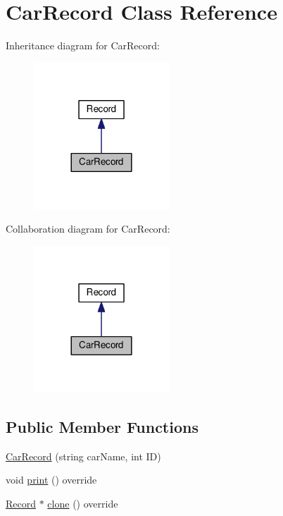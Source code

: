\hypertarget{classCarRecord}{}\section{Car\+Record Class Reference}
\label{classCarRecord}


Inheritance diagram for Car\+Record\+:\nopagebreak
\begin{figure}[H]
\begin{center}
\leavevmode
\includegraphics[width=144pt]{classCarRecord__inherit__graph}
\end{center}
\end{figure}


Collaboration diagram for Car\+Record\+:\nopagebreak
\begin{figure}[H]
\begin{center}
\leavevmode
\includegraphics[width=144pt]{classCarRecord__coll__graph}
\end{center}
\end{figure}
\subsection*{Public Member Functions}
\begin{DoxyCompactItemize}
\item 
\hyperlink{classCarRecord_ab1ff8a8eb47b4792718a2eff6012656e}{Car\+Record} (string car\+Name, int ID)
\item 
void \hyperlink{classCarRecord_a84789b5f6a61048c481d115c7058d664}{print} () override
\item 
\hyperlink{classRecord}{Record} $\ast$ \hyperlink{classCarRecord_a190ab69e95107c689455fd85099f3630}{clone} () override
\end{DoxyCompactItemize}
